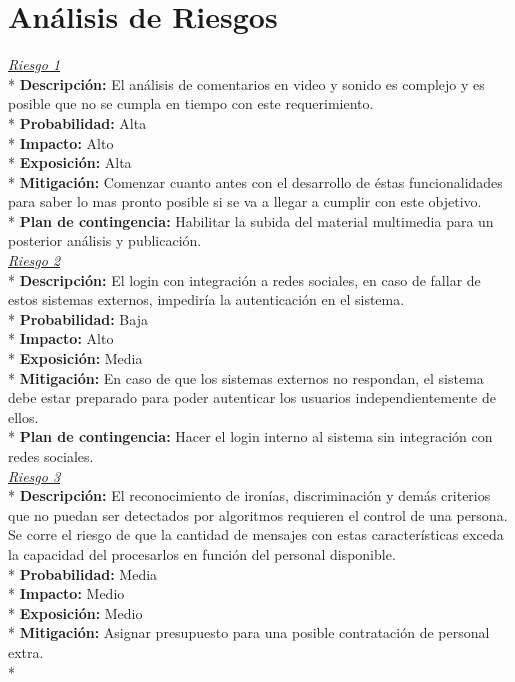 \section{Análisis de Riesgos}
\uline{\it{Riesgo 1}}\\*
{\bf{Descripción:}} El análisis de comentarios en video y sonido es complejo y es posible que no se cumpla en tiempo con este requerimiento.\\*
{\bf{Probabilidad:}} Alta\\*
{\bf{Impacto:}} Alto\\*
{\bf{Exposición:}} Alta\\*
{\bf{Mitigación:}} Comenzar cuanto antes con el desarrollo de éstas funcionalidades para saber lo mas pronto posible si se va a llegar a cumplir con este objetivo.\\*
{\bf{Plan de contingencia:}} Habilitar la subida del material multimedia para un posterior análisis y publicación.\\
\newline
\uline{\it{Riesgo 2}}\\*
{\bf{Descripción:}} El login con integración a redes sociales, en caso de fallar de estos sistemas externos,  impediría la autenticación en el sistema.\\*
{\bf{Probabilidad:}} Baja\\*
{\bf{Impacto:}} Alto\\*
{\bf{Exposición:}} Media\\*
{\bf{Mitigación:}} En caso de que los sistemas externos no respondan, el sistema debe estar preparado para poder autenticar los usuarios independientemente de ellos.\\*
{\bf{Plan de contingencia:}} Hacer el login interno al sistema sin integración con redes sociales.\\
\newline
\uline{\it{Riesgo 3}}\\*
{\bf{Descripción:}} El reconocimiento de ironías, discriminación y demás criterios que no puedan ser detectados por algoritmos requieren el control de una persona. Se corre el riesgo de que la cantidad de mensajes con estas características exceda la capacidad del procesarlos en función del personal disponible.\\*
{\bf{Probabilidad:}} Media\\*
{\bf{Impacto:}} Medio\\*
{\bf{Exposición:}} Medio\\*
{\bf{Mitigación:}} Asignar presupuesto para una posible contratación de personal extra.\\*
